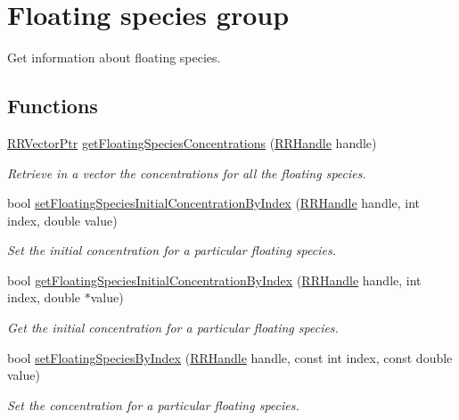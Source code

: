\hypertarget{group__floating}{\section{Floating species group}
\label{group__floating}
}


Get information about floating species.  


\subsection*{Functions}
\begin{DoxyCompactItemize}
\item 
\hyperlink{rrc__types_8h_a3be72d6006034fd349f753d2bf441bf7}{R\+R\+Vector\+Ptr} \hyperlink{group__floating_ga68e7a5d2a51820bdfe9eb96a0e67c53c}{get\+Floating\+Species\+Concentrations} (\hyperlink{rrc__types_8h_a1d68f0592372208fa5a5f2799ea4b3ae}{R\+R\+Handle} handle)
\begin{DoxyCompactList}\small\item\em Retrieve in a vector the concentrations for all the floating species. \end{DoxyCompactList}\item 
bool \hyperlink{group__floating_ga0cd4f0808862786a6cf7019f9d1d7d01}{set\+Floating\+Species\+Initial\+Concentration\+By\+Index} (\hyperlink{rrc__types_8h_a1d68f0592372208fa5a5f2799ea4b3ae}{R\+R\+Handle} handle, int index, double value)
\begin{DoxyCompactList}\small\item\em Set the initial concentration for a particular floating species. \end{DoxyCompactList}\item 
bool \hyperlink{group__floating_ga18817e95a20396665311107be6cbcde6}{get\+Floating\+Species\+Initial\+Concentration\+By\+Index} (\hyperlink{rrc__types_8h_a1d68f0592372208fa5a5f2799ea4b3ae}{R\+R\+Handle} handle, int index, double $\ast$value)
\begin{DoxyCompactList}\small\item\em Get the initial concentration for a particular floating species. \end{DoxyCompactList}\item 
bool \hyperlink{group__floating_gad77c7ee6b6edad962659d16f20497dd6}{set\+Floating\+Species\+By\+Index} (\hyperlink{rrc__types_8h_a1d68f0592372208fa5a5f2799ea4b3ae}{R\+R\+Handle} handle, const int index, const double value)
\begin{DoxyCompactList}\small\item\em Set the concentration for a particular floating species. \end{DoxyCompactList}\item 

\end{DoxyCompactItemize}
